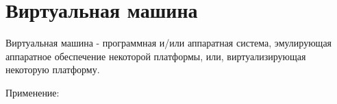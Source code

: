 \section{Виртуальная машина}

Виртуальная машина - программная и/или аппаратная система,
	эмулирующая аппаратное обеспечение некоторой платформы,
	или, виртуализирующая некоторую платформу.

Применение:

